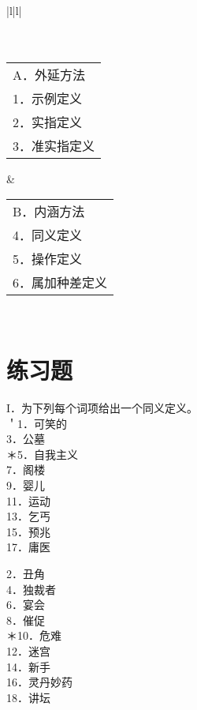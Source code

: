 \begin{center}
\begin{tabular}{|l|l|}
\hline
{} \\
\hline
{} \\
\hline
{} \\
\hline
\begin{tabular}{l}
A．外延方法 \\
1．示例定义 \\
2．实指定义 \\
3．准实指定义 \\
\end{tabular} & \begin{tabular}{l}
B．内涵方法 \\
4．同义定义 \\
5．操作定义 \\
6．属加种差定义 \\
\end{tabular} \\
\hline
\end{tabular}
\end{center}

\section*{练习题}
I．为下列每个词项给出一个同义定义。\\
＇1．可笑的\\
3．公墓\\
＊5．自我主义\\
7．阁楼\\
9．婴儿\\
11．运动\\
13．乞丐\\
15．预兆\\
17．庸医

2．丑角\\
4．独裁者\\
6．宴会\\
8．催促\\
＊10．危难\\
12．迷宫\\
14．新手\\
16．灵丹妙药\\
18．讲坛

